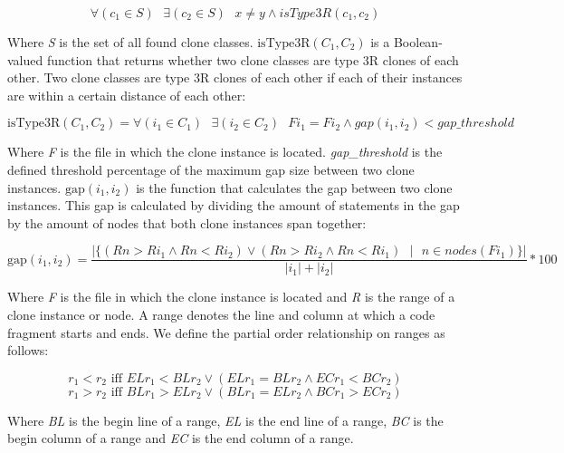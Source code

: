 \begin{equation}\label{eq:crtype3r}
\forall (c_1 \in S) \text{ }\exists (c_2 \in S)\text{ }x \neq y \land isType3R(c_1, c_2)
\end{equation}

Where \textit{S} is the set of all found clone classes. $\text{isType3R}(C_1, C_2)$ is a Boolean-valued function that returns whether two clone classes are type 3R clones of each other. Two clone classes are type 3R clones of each other if each of their instances are within a certain distance of each other:

\begin{equation}\label{eq:istype3r}
\text{isType3R}(C_1, C_2) = \forall (i_1 \in C_1)\text{ } \exists (i_2 \in C_2)\text{ } Fi_1 = Fi_2 \land gap(i_1, i_2) < gap\_threshold
\end{equation}

Where \textit{F} is the file in which the clone instance is located. \textit{gap\_threshold} is the defined threshold percentage of the maximum gap size between two clone instances. $\text{gap}(i_1, i_2)$ is the function that calculates the gap between two clone instances. This gap is calculated by dividing the amount of statements in the gap by the amount of nodes that both clone instances span together:

\begin{equation}\label{eq:t3rgap}
\text{gap}(i_1, i_2) = \frac{|\{(Rn>Ri_1 \land Rn<Ri_2) \lor (Rn>Ri_2 \land Rn<Ri_1)\text{ }|\text{ } n \in nodes(Fi_1)\}|}{|i_1| + |i_2|} * 100
\end{equation}

Where \textit{F} is the file in which the clone instance is located and \textit{R} is the range of a clone instance or node. A range denotes the line and column at which a code fragment starts and ends. We define the partial order relationship on ranges as follows:

\begin{equation}\label{eq:rangetotalorder}
r_1 < r_2 \text{ iff } ELr_1 < BLr_2 \lor (ELr_1 = BLr_2 \land ECr_1 < BCr_2)
\end{equation}
\begin{equation}\label{eq:rangetotalorder2}
r_1 > r_2 \text{ iff } BLr_1 > ELr_2 \lor (BLr_1 = ELr_2 \land BCr_1 > ECr_2)
\end{equation}

Where \textit{BL} is the begin line of a range, \textit{EL} is the end line of a range, \textit{BC} is the begin column of a range and \textit{EC} is the end column of a range.

